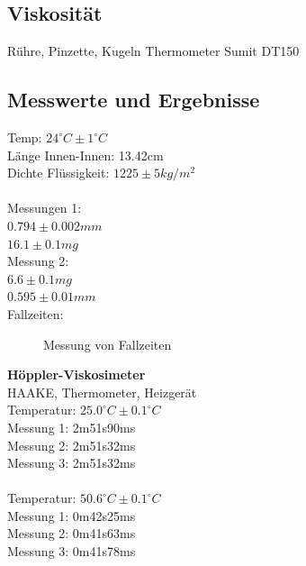 \documentclass[12pt,a4paper]{article}
\begin{document}
\begin{multicols}{2}
\section{Viskosität}
Rühre, Pinzette, Kugeln
Thermometer Sumit DT150\\
\subsection{Messwerte und Ergebnisse}
Temp: $24^{\circ}C \pm 1^{\circ}C$\\
Länge Innen-Innen: 13.42cm\\
Dichte Flüssigkeit: $1225 \pm 5 kg/m^2$\\
\\
Messungen 1:\\
$0.794 \pm 0.002mm$\\
$16.1 \pm 0.1 mg$\\
Messung 2:\\
$6.6 \pm 0.1mg$\\
$0.595 \pm 0.01mm$\\
Fallzeiten:\\
\begin{figure}[H]
	\centering
	\caption{Messung von Fallzeiten}
	\label{fig:visko_fallzeit}
\end{figure}
\noindent
\textbf{Höppler-Viskosimeter}\\
HAAKE, Thermometer, Heizgerät\\
Temperatur: $25.0^{\circ}C \pm 0.1^{\circ}C$\\
Messung 1: 2m51s90ms\\
Messung 2: 2m51s32ms\\
Messung 3: 2m51s32ms\\
\\
Temperatur: $50.6^{\circ}C \pm 0.1^{\circ}C$\\
Messung 1: 0m42s25ms\\
Messung 2: 0m41s63ms\\
Messung 3: 0m41s78ms\\
\\

\end{multicols}
\end{document}
